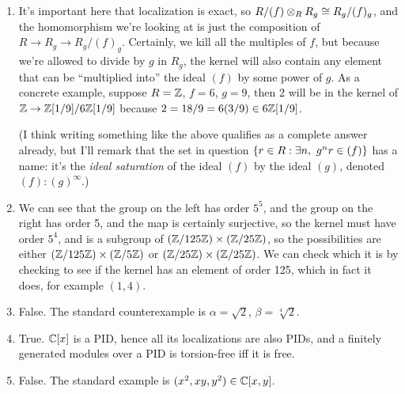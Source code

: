 \begin{solution}
\begin{enumerate}
    \item It's important here that localization is exact, so $R/(f) \otimes_R R_g \cong R_g/(f)_g$, and the homomorphism we're looking at is just the composition of $R \to R_g \to R_g/(f)_g$. Certainly, we kill all the multiples of $f$, but because we're allowed to divide by $g$ in $R_g$, the kernel will also contain any element that can be ``multiplied into'' the ideal $(f)$ by some power of $g$. As a concrete example, suppose $R = \mathbb{Z}$, $f = 6$, $g = 9$, then 2 will be in the kernel of $\mathbb{Z} \to \mathbb{Z}[1/9]/6 \mathbb{Z}[1/9]$ because $2 = 18/9 = 6(3/9) \in 6\mathbb{Z}[1/9]$.
    
    (I think writing something like the above qualifies as a complete answer already, but I'll remark that the set in question $\{r \in R: \exists n,\ g^n r \in (f)\}$ has a name: it's the \emph{ideal saturation} of the ideal $(f)$ by the ideal $(g)$, denoted $(f): (g)^{\infty}$.)
    \item We can see that the group on the left has order $5^5$, and the group on the right has order 5, and the map is certainly surjective, so the kernel must have order $5^4$, and is a subgroup of $(\mathbb{Z}/125\mathbb{Z}) \times (\mathbb{Z}/25\mathbb{Z})$, so the possibilities are either $(\mathbb{Z}/125\mathbb{Z}) \times (\mathbb{Z}/5\mathbb{Z})$ or $(\mathbb{Z}/25\mathbb{Z}) \times (\mathbb{Z}/25\mathbb{Z})$. We can check which it is by checking to see if the kernel has an element of order 125, which in fact it does, for example $(1,4)$.
    \item False. The standard counterexample is $\alpha = \sqrt{2}$, $\beta = \sqrt[4]{2}$.
    \item True. $\mathbb{C}[x]$ is a PID, hence all its localizations are also PIDs, and a finitely generated modules over a PID is torsion-free iff it is free.
    \item False. The standard example is $(x^2,xy,y^2) \in \mathbb{C}[x,y]$.
\end{enumerate}
\end{solution}

